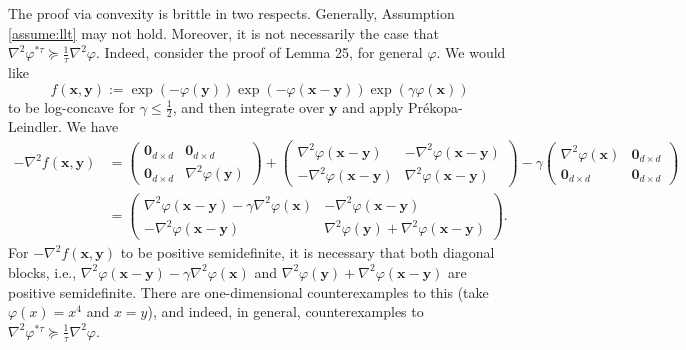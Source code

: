 \documentclass[11pt]{article}
\newcommand{\0}{\mathbf{0}}
\newcommand{\1}{\mathbf{1}}
\newcommand{\vx}{\mathbf{x}}
\newcommand{\vy}{\mathbf{y}}
\newcommand{\vhi}{\varphi}
\begin{document}
The proof via convexity is brittle in two respects.  Generally, Assumption \ref{assume:llt} may not hold.  Moreover, it is not necessarily the case that $\nabla^2 \vhi^{*\tau}\succeq \frac{1}{\tau}\nabla^2 \vhi$.  Indeed, consider the proof of Lemma 25, \cite{ShiTZ25} for general $\vhi$.  We would like 
\[f(\vx, \vy):=\exp(-\vhi(\vy))\exp(-\vhi(\vx-\vy))\exp(\gamma \vhi(\vx))\]
to be log-concave for $\gamma\leq \frac{1}{2}$, and then integrate over $\vy$ and apply Pr\'ekopa-Leindler.  We have
\begin{align*}
    -\nabla^2 f(\vx, \vy)
    &=\begin{pmatrix}
             \mathbf{0}_{d\times d} &  \mathbf{0}_{d\times d}\\
             \mathbf{0}_{d\times d} &  \nabla^2\vhi(\vy)
        \end{pmatrix}
        + \begin{pmatrix}
            \nabla^2\vhi(\vx - \vy) & -\nabla^2\vhi(\vx - \vy) \\
            -\nabla^2\vhi(\vx-\vy) & \nabla^2\vhi(\vx-\vy)
        \end{pmatrix}
        -\gamma\begin{pmatrix}
            \nabla^2\vhi(\vx) & \mathbf{0}_{d\times d}\\
             \mathbf{0}_{d\times d} &  \mathbf{0}_{d\times d}
        \end{pmatrix}\\
        &=\begin{pmatrix}
            \nabla^2\vhi(\vx-\vy)-\gamma \nabla^2\vhi(\vx) & -\nabla^2 \vhi(\vx-\vy) \\
            -\nabla^2\vhi(\vx-\vy) & \nabla^2\vhi(\vy)+\nabla^2\vhi(\vx-\vy)
        \end{pmatrix}.
\end{align*}
For $-\nabla^2 f(\vx, \vy)$ to be positive semidefinite, it is necessary that both diagonal blocks, i.e., $\nabla^2\vhi(\vx-\vy)-\gamma \nabla^2\vhi(\vx)$ and $\nabla^2\vhi(\vy)+\nabla^2\vhi(\vx-\vy)$ are positive semidefinite. There are one-dimensional counterexamples to this (take $\vhi(x) = x^4$ and $x=y$), and indeed, in general, counterexamples to $\nabla^2 \vhi^{*\tau}\succeq \frac{1}{\tau}\nabla^2 \vhi$.
\end{document}
